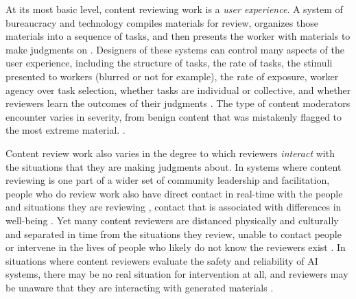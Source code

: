 At its most basic level, content reviewing work is a \textit{user experience}. A system of bureaucracy and technology compiles materials for review, organizes those materials into a sequence of tasks, and then presents the worker with materials to make judgments on \cite{gray_ghost_2019}. Designers of these systems can control many aspects of the user experience, including the structure of tasks, the rate of tasks, the stimuli presented to workers (blurred or not for example), the rate of exposure, worker agency over task selection, whether tasks are individual or collective, and whether reviewers learn the outcomes of their judgments \cite{steiger_psychological_2021}. The type of content moderators encounter varies in severity, from benign content that was mistakenly flagged to the most extreme material. \cite{steiger_psychological_2021, yang2024perceptions}.

Content review work also varies in the degree to which reviewers \textit{interact} with the situations that they are making judgments about. In systems where content reviewing is one part of a wider set of community leadership and facilitation, people who do review work also have direct contact in real-time with the people and situations they are reviewing \cite{li_all_2022, postigo_emerging_2003, matias_civic_2019}, contact that is associated with differences in well-being \cite{bulat_psychology_2024}. Yet many content reviewers are distanced physically and culturally and separated in time from the situations they review, unable to contact people or intervene in the lives of people who likely do not know the reviewers exist \cite{roberts_behind_2019, gray_ghost_2019}. In situations where content reviewers evaluate the safety and reliability of AI systems, there may be no real situation for intervention at all, and reviewers may be unaware that they are interacting with generated materials \cite{zhang_human_2024}.

